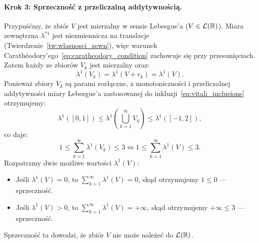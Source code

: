 \begin{dow}
    \paragraph{Krok 3: Sprzeczność z przeliczalną addytywnością.}
    Przypuśćmy, że zbiór $V$ jest mierzalny w sensie Lebesgue'a ($V \in \mathcal{L}({\mathbb{R}})$).
    Miara zewnętrzna $\lambda^{*1}$ jest niezmiennicza na translacje (Twierdzenie~\ref{tw:wlasnosci_zewn}), więc warunek Carathéodory'ego~\eqref{eq:caratheodory_condition} zachowuje się przy przesunięciach. Zatem każdy ze zbiorów $V_k$ jest mierzalny oraz:
    \begin{equation*}
        \lambda^1(V_k) = \lambda^1(V + r_k) = \lambda^1(V).
    \end{equation*}
    Ponieważ zbiory $V_k$ są parami rozłączne, z monotoniczności i przeliczalnej addytywności miary Lebesgue'a zastosowanej do inkluzji~\eqref{eq:vitali_inclusions} otrzymujemy:
    \begin{equation*}
        \lambda^1([0, 1]) \le \lambda^1\left(\bigcup_{k=1}^\infty V_k\right) \le \lambda^1([-1, 2]),
    \end{equation*}
    co daje:
    \begin{equation*}
        1 \le \sum_{k=1}^\infty \lambda^1(V_k) \le 3 \iff 1 \le \sum_{k=1}^\infty \lambda^1(V) \le 3.
    \end{equation*}
    Rozpatrzmy dwie możliwe wartości $\lambda^1(V)$:
    \begin{itemize}
        \item Jeśli $\lambda^1(V) = 0$, to $\sum_{k=1}^\infty \lambda^1(V) = 0$, skąd otrzymujemy $1 \le 0$ — sprzeczność.
        \item Jeśli $\lambda^1(V) > 0$, to $\sum_{k=1}^\infty \lambda^1(V) = +\infty$, skąd otrzymujemy $+\infty \le 3$ — sprzeczność.
    \end{itemize}
    Sprzeczność ta dowodzi, że zbiór $V$ nie może należeć do $\mathcal{L}({\mathbb{R}})$.
\end{dow}
